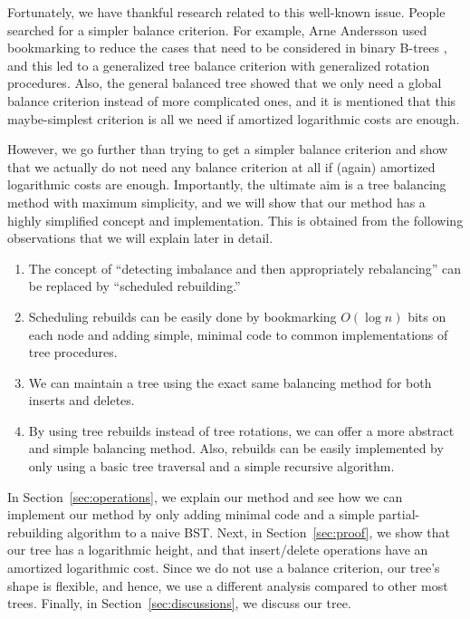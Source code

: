 \documentclass{article}
\begin{document}
Fortunately, we have thankful research related to this well-known issue. People searched for a simpler balance criterion. For example, Arne Andersson \cite{AnderssonAA} used bookmarking to reduce the cases that need to be considered in binary B-trees \cite{BayerBB}, and this led to a generalized tree balance criterion with generalized rotation procedures. Also, the general balanced tree \cite{AnderssonGBT} showed that we only need a global balance criterion instead of more complicated ones, and it is mentioned that this maybe-simplest criterion is all we need if amortized logarithmic costs are enough.

However, we go further than trying to get a simpler balance criterion and show that we actually do not need any balance criterion at all if (again) amortized logarithmic costs are enough. Importantly, the ultimate aim is a tree balancing method with maximum simplicity, and we will show that our method has a highly simplified concept and implementation. This is obtained from the following observations that we will explain later in detail.
\begin{enumerate}[$\bullet$]
\item The concept of ``detecting imbalance and then appropriately rebalancing'' can be replaced by ``scheduled rebuilding.''
\item Scheduling rebuilds can be easily done by bookmarking $O(\log n)$ bits on each node and adding simple, minimal code to common implementations of tree procedures.
\item We can maintain a tree using the exact same balancing method for both inserts and deletes.
\item By using tree rebuilds instead of tree rotations, we can offer a more abstract and simple balancing method. Also, rebuilds can be easily implemented by only using a basic tree traversal and a simple recursive algorithm.
\end{enumerate}

In Section~\ref{sec:operations}, we explain our method and see how we can implement our method by only adding minimal code and a simple partial-rebuilding algorithm to a naive BST. Next, in Section~\ref{sec:proof}, we show that our tree has a logarithmic height, and that insert/delete operations have an amortized logarithmic cost. Since we do not use a balance criterion, our tree's shape is flexible, and hence, we use a different analysis compared to other most trees. Finally, in Section~\ref{sec:discussions}, we discuss our tree.
\end{document}

